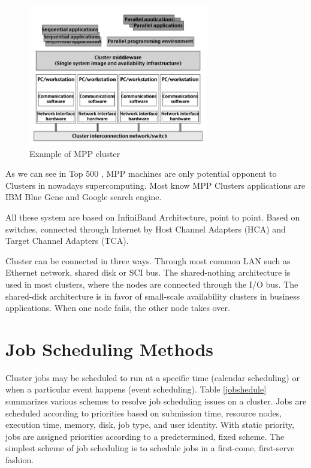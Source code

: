 \documentclass[12pt]{report}
\begin{document}
\begin{figure}[ht]
\centering
     \includegraphics[width=0.7\textwidth]{mpp.png}
      \caption{Example of MPP cluster}
       \label{mpp}
\end{figure} 

As we can see in Top 500 \cite{top500}, MPP machines are only potential opponent to Clusters in nowadays supercomputing. Most know MPP Clusters applications are IBM Blue Gene and Google search engine.

All these system are based on InfiniBand Architecture, point to point. Based on switches, connected through Internet by Host Channel Adapters (HCA) and Target Channel Adapters (TCA).

Cluster can be connected in three ways. Through most common LAN such as Ethernet network, shared disk or SCI bus. The shared-nothing architecture is used in most clusters, where the nodes are connected through the I/O bus. The shared-disk architecture is in favor of small-scale availability clusters in business applications. When one node fails, the other node takes over.

\section{Job Scheduling Methods}
Cluster jobs may be scheduled to run at a specific time (calendar scheduling) or when a particular event happens (event scheduling). Table \ref{jobshedule} summarizes various schemes to resolve job scheduling issues on a cluster. Jobs are scheduled according to priorities based on submission time, resource nodes, execution time, memory, disk, job type, and user identity. With static priority, jobs are assigned priorities according to a predetermined, fixed scheme. The simplest scheme of job scheduling is to schedule jobs in a first-come, first-serve fashion.
\end{document}
